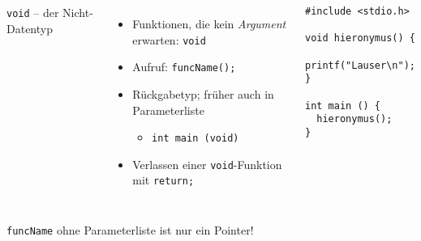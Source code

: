 \begin{frame}[fragile]%
%
\begin{columns}[T]
\begin{Large}
\texttt{void} -- der Nicht-Datentyp
\vspace{10pt}
\end{Large}
\begin{itemize}
\item Funktionen, die kein \emph{Argument} erwarten: \texttt{void}
\item Aufruf: \texttt{funcName();}
\item Rückgabetyp; früher auch in Parameterliste
	\begin{itemize}
	\item \texttt{int main (void)}
	\end{itemize}
\item Verlassen einer \texttt{void}-Funktion mit \texttt{return;}
\end{itemize}
%
\begin{codebox}
\begin{verbatim}
#include <stdio.h>

void hieronymus() {
  printf("Lauser\n");
}

int main () {
  hieronymus();
}
\end{verbatim}
\end{codebox}
\end{columns}
%
\begin{hintbox}
\texttt{funcName} ohne Parameterliste ist nur ein Pointer!
\end{hintbox}
%
\end{frame}


